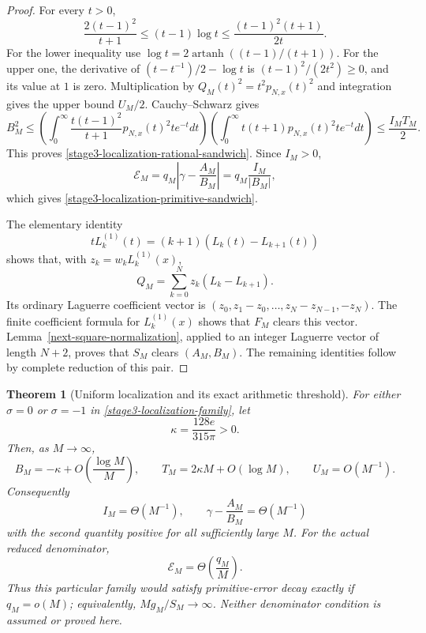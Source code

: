 \documentclass[11pt,a4paper]{article}
\newtheorem{theorem}{Theorem}[section]
\theoremstyle{definition}
\theoremstyle{remark}
\begin{document}
\begin{proof}
For every $t>0$,
\[
 \frac{2(t-1)^2}{t+1}
 \le(t-1)\log t
 \le\frac{(t-1)^2(t+1)}{2t}.
\]
For the lower inequality use
$\log t=2\operatorname{artanh}((t-1)/(t+1))$.
For the upper one, the derivative of
$(t-t^{-1})/2-\log t$ is $(t-1)^2/(2t^2)\ge0$, and its value at $1$
is zero. Multiplication by $Q_M(t)^2=t^2p_{N,x}(t)^2$ and integration
gives the upper bound $U_M/2$. Cauchy--Schwarz gives
\[
 B_M^2
 \le
 \left(\int_0^\infty
       \frac{t(t-1)^2}{t+1}p_{N,x}(t)^2t e^{-t}dt\right)
 \left(\int_0^\infty t(t+1)p_{N,x}(t)^2t e^{-t}dt\right)
 \le\frac{I_MT_M}{2}.
\]
This proves \eqref{stage3-localization-rational-sandwich}.
Since $I_M>0$,
\[
 \mathcal E_M=q_M\left|\gamma-\frac{A_M}{B_M}\right|
             =q_M\frac{I_M}{|B_M|},
\]
which gives \eqref{stage3-localization-primitive-sandwich}.

The elementary identity
\[
 tL_k^{(1)}(t)=(k+1)(L_k(t)-L_{k+1}(t))
\]
shows that, with $z_k=w_kL_k^{(1)}(x)$,
\[
 Q_M=\sum_{k=0}^N z_k(L_k-L_{k+1}).
\]
Its ordinary Laguerre coefficient vector is
$(z_0,z_1-z_0,\ldots,z_N-z_{N-1},-z_N)$.
The finite coefficient formula for $L_k^{(1)}(x)$ shows that $F_M$
clears this vector. Lemma~\ref{next-square-normalization}, applied to an integer
Laguerre vector of length $N+2$, proves that $S_M$ clears $(A_M,B_M)$.
The remaining identities follow by complete reduction of this pair.
\end{proof}

\begin{theorem}[Uniform localization and its exact arithmetic threshold]
\label{stage3-localization-asymptotic}
For either $\sigma=0$ or $\sigma=-1$ in
\eqref{stage3-localization-family}, let
\[
 \kappa=\frac{128e}{315\pi}>0.
\]
Then, as $M\to\infty$,
\[
 B_M=-\kappa+O\left(\frac{\log M}{M}\right),\qquad
 T_M=2\kappa M+O(\log M),\qquad
 U_M=O(M^{-1}).
\]
Consequently
\[
 I_M=\Theta(M^{-1}),\qquad
 \gamma-\frac{A_M}{B_M}=\Theta(M^{-1})
\]
with the second quantity positive for all sufficiently large $M$.
For the actual reduced denominator,
\begin{equation}
 \mathcal E_M=\Theta\!\left(\frac{q_M}{M}\right).
 \label{stage3-localization-threshold}
\end{equation}
Thus this particular family would satisfy primitive-error decay exactly
if $q_M=o(M)$; equivalently, $Mg_M/S_M\to\infty$.
Neither denominator condition is assumed or proved here.
\end{theorem}
\end{document}
